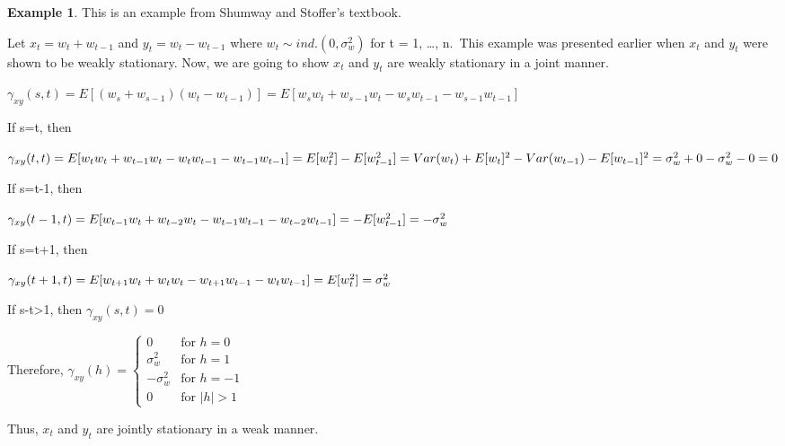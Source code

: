 \documentclass[
]{book}
\theoremstyle{definition}
\theoremstyle{definition}
\newtheorem{example}{Example}[chapter]
\theoremstyle{definition}
\theoremstyle{definition}
\theoremstyle{remark}
\begin{document}
\begin{example}
This is an example from Shumway and Stoffer's textbook.

Let \(x_t = w_t + w_{t-1}\) and \(y_t = w_t - w_{t-1}\) where \(w_t \sim ind.(0, \sigma_w^2)\) for t = 1, \ldots, n.~This example was presented earlier when \(x_t\) and \(y_t\) were shown to be weakly stationary. Now, we are going to show \(x_t\) and \(y_t\) are weakly stationary in a joint manner.

\(\gamma_{xy}(s,t)=E[(w_s+w_{s-1})(w_t-w_{t-1})]=E[w_sw_t+w_{s-1}w_t-w_sw_{t-1}-w_{s-1}w_{t-1}]\)

If s=t, then

\(\gamma_{xy}(t,t)=E[w_tw_t+w_{t-1}w_t-w_tw_{t-1}-w_{t-1}w_{t-1}]\\ =E[w_t^2]-E[w_{t-1}^2]\\=Var(w_t)+E[w_t]^2-Var(w_{t-1})-E[w_{t-1}]^2\\=\sigma_w^2+0-\sigma_w^2-0\\=0\)

If s=t-1, then

\(\gamma_{xy}(t-1,t)=E[w_{t-1}w_t+w_{t-2}w_t-w_{t-1}w_{t-1}-w_{t-2}w_{t-1}]\\=-E[w_{t-1}^2]=-\sigma_w^2\)

If s=t+1, then

\(\gamma_{xy}(t+1,t)=E[w_{t+1}w_t+w_tw_t-w_{t+1}w_{t-1}-w_tw_{t-1}]\\=E[w_t^2]=\sigma_w^2\)

If \textbar s-t\textbar\textgreater1, then \(\gamma_{xy}(s,t)=0\)

Therefore, \(\gamma_{xy}(h)=\begin{cases}0 & \text{for } h=0 \\ \sigma_w^2 & \text{for } h=1 \\ -\sigma_w^2 & \text{for } h=-1 \\ 0 & \text{for } |h|>1 \end{cases}\)

Thus, \(x_t\) and \(y_t\) are jointly stationary in a weak manner.
\end{example}
\end{document}
